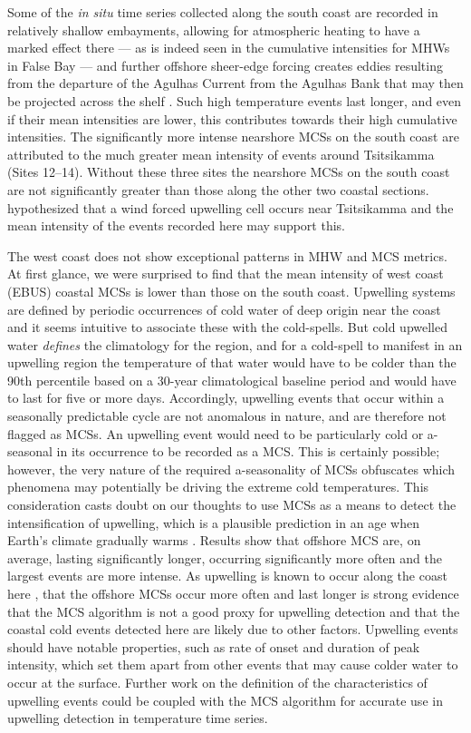 \documentclass[a4paper,10pt,review]{elsarticle}
\begin{document}
Some of the \emph{in situ} time series collected along the south coast are recorded in relatively shallow embayments, allowing for atmospheric heating to have a marked effect there --- as is indeed seen in the cumulative intensities for MHWs in False Bay --- and further offshore sheer-edge forcing creates eddies resulting from the departure of the Agulhas Current from the Agulhas Bank that may then be projected across the shelf \citep{Lutjeharms2003}. Such high temperature events last longer, and even if their mean intensities are lower, this contributes towards their high cumulative intensities. The significantly more intense nearshore MCSs on the south coast are attributed to the much greater mean intensity of events around Tsitsikamma (Sites 12--14). Without these three sites the nearshore MCSs on the south coast are not significantly greater than those along the other two coastal sections. \citep{Roberts2005} hypothesized that a wind forced upwelling cell occurs near Tsitsikamma and the mean intensity of the events recorded here may support this.

The west coast does not show exceptional patterns in MHW and MCS metrics. At first glance, we were surprised to find that the mean intensity of west coast (EBUS) coastal MCSs is lower than those on the south coast. Upwelling systems are defined by periodic occurrences of cold water of deep origin near the coast \citep{Lutjeharms2000, Hutchings2009} and it seems intuitive to associate these with the cold-spells. But cold upwelled water \emph{defines} the climatology for the region, and for a cold-spell to manifest in an upwelling region the temperature of that water would have to be colder than the 90th percentile based on a 30-year climatological baseline period and would have to last for five or more days. Accordingly, upwelling events that occur within a seasonally predictable cycle are not anomalous in nature, and are therefore not flagged as MCSs. An upwelling event would need to be particularly cold or a-seasonal in its occurrence to be recorded as a MCS. This is certainly possible; however, the very nature of the required a-seasonality of MCSs obfuscates which phenomena may potentially be driving the extreme cold temperatures. This consideration casts doubt on our thoughts to use MCSs as a means to detect the intensification of upwelling, which is a plausible prediction in an age when Earth's climate gradually warms \citep{Garcia-Reyes2015}. Results show that offshore MCS are, on average, lasting significantly longer, occurring significantly more often and the largest events are more intense. As upwelling is known to occur along the coast here \citep{Hutchings2009}, that the offshore MCSs occur more often and last longer is strong evidence that the MCS algorithm is not a good proxy for upwelling detection and that the coastal cold events detected here are likely due to other factors. Upwelling events should have notable properties, such as rate of onset and duration of peak intensity, which set them apart from other events that may cause colder water to occur at the surface. Further work on the definition of the characteristics of upwelling events could be coupled with the MCS algorithm for accurate use in upwelling detection in temperature time series.
\end{document}
